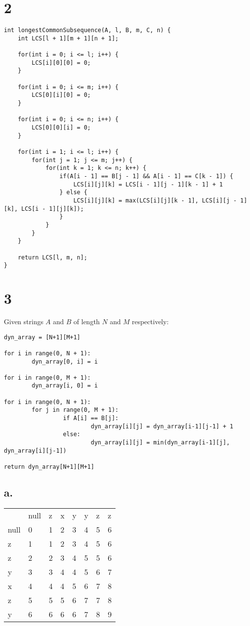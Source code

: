 \documentclass[letterpaper,notitlepage,twoside]{article}
\begin{document}
\section*{2}
\begin{verbatim}
int longestCommonSubsequence(A, l, B, m, C, n) {
    int LCS[l + 1][m + 1][n + 1];

    for(int i = 0; i <= l; i++) {
        LCS[i][0][0] = 0;
    }

    for(int i = 0; i <= m; i++) {
        LCS[0][i][0] = 0;
    }

    for(int i = 0; i <= n; i++) {
        LCS[0][0][i] = 0;
    }

    for(int i = 1; i <= l; i++) {
        for(int j = 1; j <= m; j++) {
            for(int k = 1; k <= n; k++) {
                if(A[i - 1] == B[j - 1] && A[i - 1] == C[k - 1]) {
                    LCS[i][j][k] = LCS[i - 1][j - 1][k - 1] + 1
                } else {
                    LCS[i][j][k] = max(LCS[i][j][k - 1], LCS[i][j - 1][k], LCS[i - 1][j][k]);
                }
            }
        }
    }

    return LCS[l, m, n];
}
\end{verbatim}
\section*{3}
Given strings $A$ and $B$ of length $N$ and $M$ respectively:
\begin{verbatim}
dyn_array = [N+1][M+1]

for i in range(0, N + 1):	
        dyn_array[0, i] = i

for i in range(0, M + 1):	
        dyn_array[i, 0] = i

for i in range(0, N + 1):
        for j in range(0, M + 1):
                 if A[i] == B[j]:
                         dyn_array[i][j] = dyn_array[i-1][j-1] + 1
                 else:
                         dyn_array[i][j] = min(dyn_array[i-1][j], dyn_array[i][j-1])

return dyn_array[N+1][M+1]
\end{verbatim}
\subsection*{a.}

\begin{tabular}{llllllll}
     & null & z & x & y & y & z & z \\
null & 0    & 1 & 2 & 3 & 4 & 5 & 6 \\
z    & 1    & 1 & 2 & 3 & 4 & 5 & 6 \\
z    & 2    & 2 & 3 & 4 & 5 & 5 & 6 \\
y    & 3    & 3 & 4 & 4 & 5 & 6 & 7 \\
x    & 4    & 4 & 4 & 5 & 6 & 7 & 8 \\
z    & 5    & 5 & 5 & 6 & 7 & 7 & 8 \\
y    & 6    & 6 & 6 & 6 & 7 & 8 & 9 \\
\end{tabular}
\end{document}
